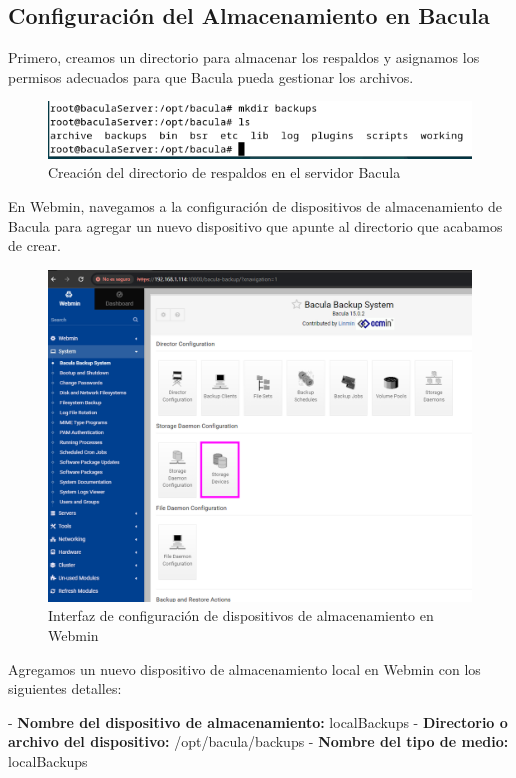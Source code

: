 \subsection{Configuración del Almacenamiento en Bacula}

Primero, creamos un directorio para almacenar los respaldos y asignamos los permisos adecuados para que Bacula pueda gestionar los archivos.

\begin{figure}[H]
    \centering
    \includegraphics[width=0.5\linewidth]{instalacionBacula/mkdirbackups.png}
    \caption{Creación del directorio de respaldos en el servidor Bacula}
\end{figure}

En Webmin, navegamos a la configuración de dispositivos de almacenamiento de Bacula para agregar un nuevo dispositivo que apunte al directorio que acabamos de crear.

\begin{figure}[H]
    \centering
    \includegraphics[width=0.5\linewidth]{instalacionBacula/STO.png}
    \caption{Interfaz de configuración de dispositivos de almacenamiento en Webmin}
\end{figure}

Agregamos un nuevo dispositivo de almacenamiento local en Webmin con los siguientes detalles:

- \textbf{Nombre del dispositivo de almacenamiento:} localBackups
- \textbf{Directorio o archivo del dispositivo:} /opt/bacula/backups
- \textbf{Nombre del tipo de medio:} localBackups

